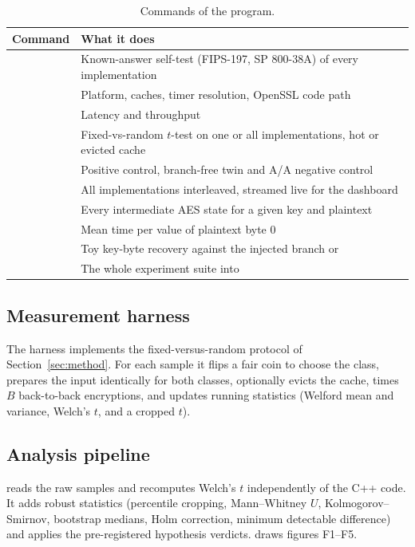 \begin{table}[htbp]
\centering
\small
\renewcommand{\arraystretch}{1.15}
\begin{tabular}{@{}P{0.16\textwidth}P{0.74\textwidth}@{}}
\toprule
Command & What it does \\
\midrule
{} & Known-answer self-test (FIPS-197, SP 800-38A) of every implementation \\
 & Platform, caches, timer resolution, OpenSSL code path \\
 & Latency and throughput \\
 & Fixed-vs-random $t$-test on one or all implementations, hot or evicted cache \\
 & Positive control, branch-free twin and A/A negative control \\
 & All implementations interleaved, streamed live for the dashboard \\
 & Every intermediate AES state for a given key and plaintext \\
 & Mean time per value of plaintext byte 0 \\
 & Toy key-byte recovery against the injected branch or  \\
 & The whole experiment suite into  \\
\bottomrule
\end{tabular}
\caption{Commands of the  program.}
\label{tab:cli}
\end{table}

\subsection{Measurement harness}

The harness implements the fixed-versus-random protocol of Section~\ref{sec:method}. For each sample it flips a fair coin to choose the class, prepares the input identically for both classes, optionally evicts the cache, times $B$ back-to-back encryptions, and updates running statistics (Welford mean and variance, Welch's $t$, and a cropped $t$).

\subsection{Analysis pipeline}

 reads the raw samples and recomputes Welch's $t$ independently of the C++ code. It adds robust statistics (percentile cropping, Mann--Whitney $U$, Kolmogorov--Smirnov, bootstrap medians, Holm correction, minimum detectable difference) and applies the pre-registered hypothesis verdicts.  draws figures F1--F5.

